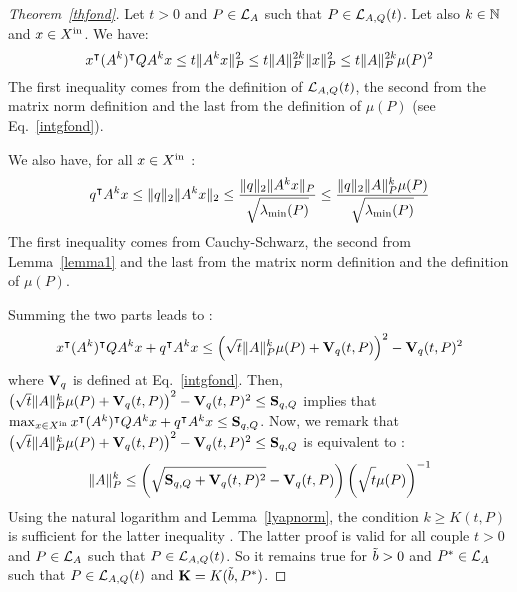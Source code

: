 \documentclass[10pt]{llncs}
\begin{document}
\begin{proof}[Theorem~\ref{thfond}]
Let $t>0$ and $P\in\mathcal{L}_{A}$ such that $P\in\mathcal{L}_{A,Q}(t)$. Let also $k\in\mathbb{N}$ and $x\in X^\mathrm{in}$. We have:
\[
x^\intercal (A^k)^\intercal Q A^k x  
\leq  t \| A^k x\|_P^2\leq t\| A\|^{2k}_P \| x\|^2_P
\leq t\| A\|_P^{2k} \mu(P)^2
\]
The first inequality comes from the definition of $\mathcal{L}_{A,Q}(t)$, the second from the matrix norm definition and the last from the definition of $\mu(P)$ (see Eq.~\eqref{intgfond}).

We also have, for all $x\in X^\mathrm{in}$ :
\[
q^\intercal A^k x
\leq \| q\|_2 \| A^k x\|_2\leq \dfrac{\| q\|_2 \| A^k x\|_P}{\sqrt{\strut \lambda_{\operatorname{min}}(P)}} 
\leq \dfrac{\| q\|_2\| A\|_P^{k} \mu(P)}{\sqrt{\strut \lambda_{\operatorname{min}}(P)}}
\]
The first inequality comes from Cauchy-Schwarz, the second from Lemma~\ref{lemma1} and the last from the matrix norm definition and the definition of $\mu(P)$. 

Summing the two parts leads to :
\[
x^\intercal (A^k)^\intercal Q A^k x+q^\intercal A^k x\leq \left(\sqrt{t}\| A\|_P^k\mu(P)+\mathbf{V}_{q}(t,P)\right)^2-\mathbf{V}_{q}(t,P)^2
\]
where $\mathbf{V}_{q}$ is defined at Eq.~\eqref{intgfond}. Then, $ \left(\sqrt{t}\| A\|_P^k\mu(P)+\mathbf{V}_{q}(t,P)\right)^2-\mathbf{V}_{q}(t,P)^2\leq \mathbf{S}_{q,Q}$ implies that $ \max_{x\in X^\mathrm{in}} x^\intercal (A^k)^\intercal Q A^k x+q^\intercal A^k x\leq \mathbf{S}_{q,Q}$. Now, we remark that  $\left(\sqrt{t}\| A\|_P^k\mu(P)+\mathbf{V}_{q}(t,P)\right)^2-\mathbf{V}_{q}(t,P)^2\leq \mathbf{S}_{q,Q}$ is equivalent to :
\[
\| A\|_P^k\leq \left(\sqrt{\strut \mathbf{S}_{q,Q}+\mathbf{V}_{q}(t,P)^2}-\mathbf{V}_{q}(t,P)\right)\left(\sqrt{\strut t}\mu(P)\right)^{-1}
\]
Using the natural logarithm and Lemma~\ref{lyapnorm}, the condition  $k\geq K(t,P)$ is sufficient for the latter inequality .  The latter proof is valid for all couple $t>0$ and $P\in\mathcal{L}_{A}$ such that $P\in\mathcal{L}_{A,Q}(t)$. So it remains true for   $\tilde{b}>0$ and $P^*\in\mathcal{L}_{A}$ such that $P\in\mathcal{L}_{A,Q}(t)$ and $\mathbf{K}=K(\tilde{b},P^*)$. 
\end{proof}
\end{document}
